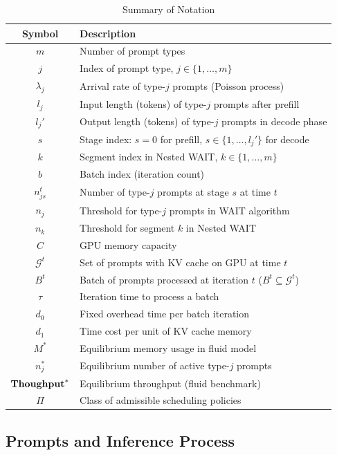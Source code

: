 \begin{table}[h]
\centering
\caption{Summary of Notation}
\label{tab:notation}
\small
\begin{tabular}{cl}
\toprule
\textbf{Symbol} & \textbf{Description} \\
\midrule
$m$ & Number of prompt types \\
$j$ & Index of prompt type, $j \in \{1, \dots, m\}$ \\
$\lambda_j$ & Arrival rate of type-$j$ prompts (Poisson process) \\
$l_j$ & Input length (tokens) of type-$j$ prompts after prefill \\
$l_j'$ & Output length (tokens) of type-$j$ prompts in decode phase \\
$s$ & Stage index: $s = 0$ for prefill, $s \in \{1, \dots, l_j'\}$ for decode \\
$k$ & Segment index in Nested WAIT, $k \in \{1, \dots, m\}$ \\
$b$ & Batch index (iteration count) \\
$n_{js}^t$ & Number of type-$j$ prompts at stage $s$ at time $t$ \\
$n_j$ & Threshold for type-$j$ prompts in WAIT algorithm \\
$n_k$ & Threshold for segment $k$ in Nested WAIT \\
\midrule
$C$ & GPU memory capacity \\
$\mathcal{G}^t$ & Set of prompts with KV cache on GPU at time $t$ \\
$B^t$ & Batch of prompts processed at iteration $t$ ($B^t \subseteq \mathcal{G}^t$) \\
$\tau$ & Iteration time to process a batch \\
$d_0$ & Fixed overhead time per batch iteration \\
$d_1$ & Time cost per unit of KV cache memory \\
\midrule
$M^*$ & Equilibrium memory usage in fluid model \\
$n_j^*$ & Equilibrium number of active type-$j$ prompts \\
$\textbf{Thoughput}^*$ & Equilibrium throughput (fluid benchmark) \\
$\Pi$ & Class of admissible scheduling policies \\
\bottomrule
\end{tabular}
\end{table}

\subsection{Prompts and Inference Process}

